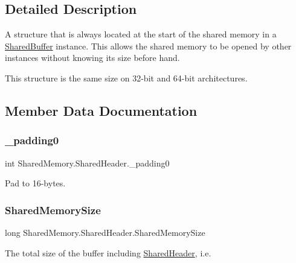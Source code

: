 \subsection{Detailed Description}
A structure that is always located at the start of the shared memory in a \hyperlink{class_shared_memory_1_1_shared_buffer}{Shared\+Buffer} instance. This allows the shared memory to be opened by other instances without knowing its size before hand. 

This structure is the same size on 32-\/bit and 64-\/bit architectures.

\subsection{Member Data Documentation}
\mbox{\label{struct_shared_memory_1_1_shared_header_a8c49168c17cca7506c00915c7b6528ef}} 
\subsubsection{\texorpdfstring{\+\_\+padding0}{\_padding0}}
{\footnotesize\ttfamily int Shared\+Memory.\+Shared\+Header.\+\_\+padding0}



Pad to 16-\/bytes. 

\mbox{\label{struct_shared_memory_1_1_shared_header_abc3cc4a636cd2a69034692a0efb6f264}} 
\subsubsection{\texorpdfstring{Shared\+Memory\+Size}{SharedMemorySize}}
{\footnotesize\ttfamily long Shared\+Memory.\+Shared\+Header.\+Shared\+Memory\+Size}



The total size of the buffer including \hyperlink{struct_shared_memory_1_1_shared_header}{Shared\+Header}, i.\+e. 

